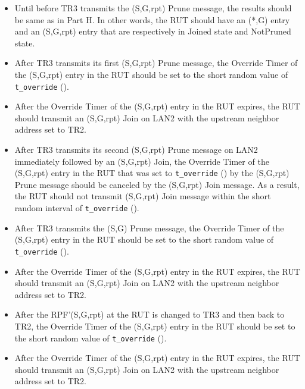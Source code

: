 \documentclass[11pt]{report}
\begin{document}

\begin{itemize}

  \item Until before TR3 transmits the (S,G,rpt) Prune message, the results
  should be same as in Part H. In other words, the RUT should have an (*,G)
  entry and an (S,G,rpt) entry that are respectively in Joined state and
  NotPruned state.

  \item After TR3 transmits its first (S,G,rpt) Prune message, the Override
  Timer of the (S,G,rpt) entry in the RUT should be set to the short random
  value of \verb=t_override= ({\PimsmTOverride}).

  \item After the Override Timer of the (S,G,rpt) entry in the RUT expires,
  the RUT should transmit an (S,G,rpt) Join on LAN2 with the upstream neighbor
  address set to TR2.

  \item After TR3 transmits its second (S,G,rpt) Prune message on LAN2
  immediately followed by an (S,G,rpt) Join, the Override Timer of the
  (S,G,rpt) entry in the RUT that was set to \verb=t_override=
  ({\PimsmTOverride}) by the (S,G,rpt) Prune message should be canceled by the
  (S,G,rpt) Join message. As a result, the RUT should not transmit (S,G,rpt)
  Join message within the short random interval of \verb=t_override=
  ({\PimsmTOverride}).

  \item After TR3 transmits the (S,G) Prune message, the Override
  Timer of the (S,G,rpt) entry in the RUT should be set to the short random
  value of \verb=t_override= ({\PimsmTOverride}).

  \item After the Override Timer of the (S,G,rpt) entry in the RUT expires,
  the RUT should transmit an (S,G,rpt) Join on LAN2 with the upstream neighbor
  address set to TR2.

  \item After the RPF'(S,G,rpt) at the RUT is changed to TR3 and then back to
  TR2, the Override Timer of the (S,G,rpt) entry in the RUT should be set to
  the short random value of \verb=t_override= ({\PimsmTOverride}).

  \item After the Override Timer of the (S,G,rpt) entry in the RUT expires,
  the RUT should transmit an (S,G,rpt) Join on LAN2 with the upstream neighbor
  address set to TR2.


\end{itemize}
\end{document}
